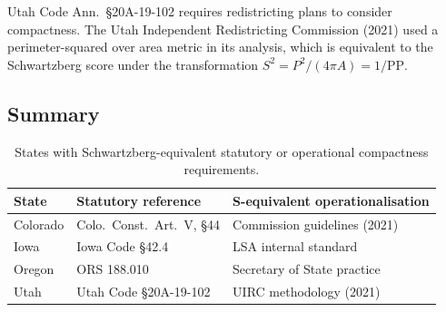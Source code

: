 Utah Code Ann.\ \S 20A-19-102 requires redistricting plans to consider compactness.
The Utah Independent Redistricting Commission (2021) used a perimeter-squared
over area metric in its analysis, which is equivalent to the Schwartzberg
score under the transformation $S^2 = P^2/(4\pi A) = 1/\text{PP}$.

\subsection{Summary}

\begin{table}[ht]
\centering
\caption{States with Schwartzberg-equivalent statutory or operational compactness requirements.}
\label{tab:statutory}
\begin{tabular}{lll}
\toprule
State & Statutory reference & S-equivalent operationalisation \\
\midrule
Colorado & Colo.\ Const.\ Art.\ V, \S 44 & Commission guidelines (2021) \\
Iowa     & Iowa Code \S 42.4              & LSA internal standard \\
Oregon   & ORS 188.010                    & Secretary of State practice \\
Utah     & Utah Code \S 20A-19-102        & UIRC methodology (2021) \\
\bottomrule
\end{tabular}
\end{table}

